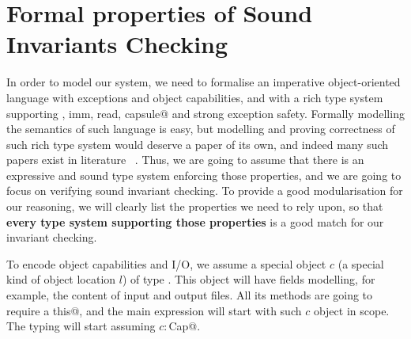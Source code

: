 \saveSpace
\section{Formal properties of Sound Invariants Checking}
\label{s:meaning}
\saveSpace
In order to model our system, we need to formalise an imperative object-oriented language
with exceptions and object capabilities,  and with a rich type system
supporting \Q@mut, imm, read, capsule@ and strong exception safety.
Formally modelling the semantics of such language is easy, but 
modelling and proving correctness of such rich type system would deserve a paper
of its own, and indeed many such papers exist in literature%
~\cite{ServettoEtAl13a,ServettoZucca15,GordonEtAl12,clebsch2015deny,JOT:issue_2011_01/article1}.
Thus, we are going to assume that there is an expressive and sound type system enforcing
those properties, and we are going to focus on verifying sound invariant checking.
To provide a good modularisation for our reasoning, 
we will clearly list the properties we need to rely upon, so that \textbf{every type
system supporting those properties} is a good match for our invariant checking.

To encode object capabilities and I/O, we assume a special object
$c$ (a special kind of object location $l$) of type \Q@Cap@.
This object will have fields modelling, for example, the content of input and output files.
All its methods are going to require a \Q@mut this@, and the main expression will start with
such  $c$ object in scope.
The typing will start assuming $c:$\Q@mut Cap@.

